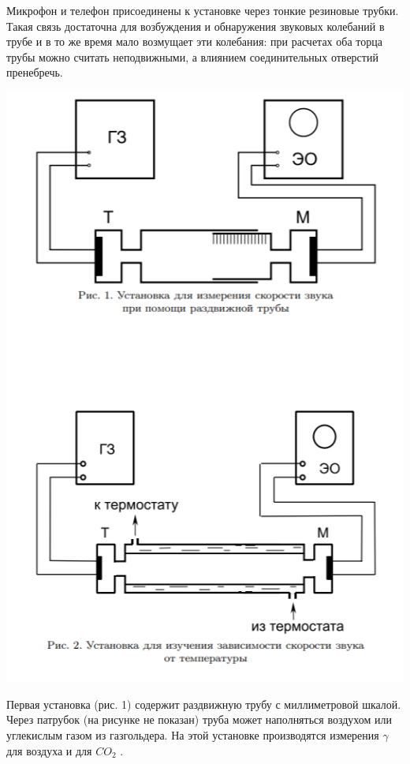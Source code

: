 \documentclass[12pt,a4paper]{article}
\begin{document}
	Микрофон и телефон присоединены к установке через тонкие резиновые трубки. Такая связь достаточна для возбуждения и обнаружения звуковых колебаний в трубе и в то же время мало возмущает эти колебания: при расчетах оба торца трубы можно считать неподвижными, а влиянием соединительных отверстий пренебречь.\\
	
	\begin{center}
		\includegraphics[scale=1]{pic1.png}
	\end{center}
	
	Первая установка (рис. 1) содержит раздвижную трубу с миллиметровой шкалой. Через патрубок (на рисунке не показан) труба может наполняться воздухом или углекислым газом из газгольдера. На этой установке производятся измерения $\gamma$ для воздуха и для $CO_2$ .\\
	
\end{document}
